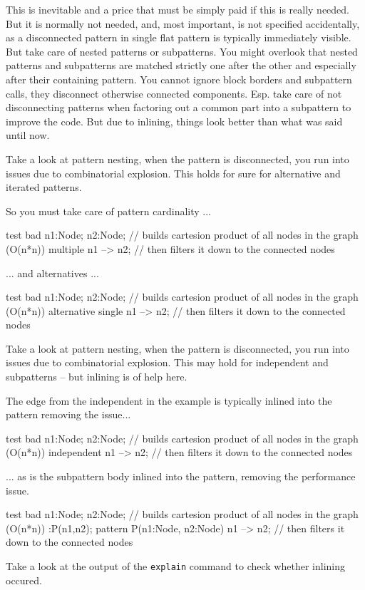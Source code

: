 This is inevitable and a price that must be simply paid if this is really needed.
But it is normally not needed, and, most important, is not specified accidentally, as a disconnected pattern in single flat pattern is typically immediately visible.
But take care of nested patterns or subpatterns.
You might overlook that nested patterns and subpatterns are matched strictly one after the other and especially after their containing pattern.
You cannot ignore block borders and subpattern calls, they disconnect otherwise connected components.
Esp. take care of not disconnecting patterns when factoring out a common part into a subpattern to improve the code.
But due to inlining, things look better than what was said until now.

\begin{example}
Take a look at pattern nesting, when the pattern is disconnected, you run into issues due to combinatorial explosion.
This holds for sure for alternative and iterated patterns.

So you must take care of pattern cardinality ...
\begin{grgen}
test bad {
	n1:Node; n2:Node; // builds cartesion product of all nodes in the graph (O(n*n))
  multiple {
		n1 --> n2; // then filters it down to the connected nodes
  }
}
\end{grgen}
... and alternatives ...
\begin{grgen}
test bad {
	n1:Node; n2:Node; // builds cartesion product of all nodes in the graph (O(n*n))
  alternative {
		single {
			n1 --> n2; // then filters it down to the connected nodes
		}
  }
}
\end{grgen}
\end{example}

\begin{example}
Take a look at pattern nesting, when the pattern is disconnected, you run into issues due to combinatorial explosion.
This may hold for independent and subpatterns -- but inlining is of help here.

The edge from the independent in the example is typically inlined into the pattern removing the issue...
\begin{grgen}
test bad {
	n1:Node; n2:Node; // builds cartesion product of all nodes in the graph (O(n*n))
  independent {
		n1 --> n2; // then filters it down to the connected nodes
  }
}
\end{grgen}
... as is the subpattern body inlined into the pattern, removing the performance issue.
\begin{grgen}
test bad {
	n1:Node; n2:Node; // builds cartesion product of all nodes in the graph (O(n*n))
  :P(n1,n2);
}
pattern P(n1:Node, n2:Node) {
	n1 --> n2; // then filters it down to the connected nodes
}
\end{grgen}
Take a look at the output of the \texttt{explain} command to check whether inlining occured.
\end{example}

